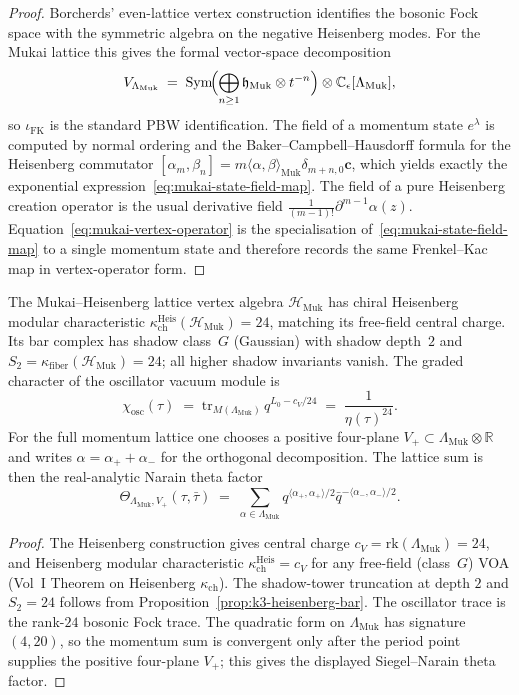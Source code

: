 \begin{proof}
Borcherds' even-lattice vertex construction identifies the bosonic Fock
space with the symmetric algebra on the negative Heisenberg modes. For
the Mukai lattice this gives the formal vector-space decomposition
\[
 V_{\Lambda_{\mathrm{Muk}}}
 \;=\;
 \mathrm{Sym}\!\Bigl(\bigoplus_{n\geq 1}\mathfrak{h}_{\mathrm{Muk}}\otimes t^{-n}\Bigr)
 \otimes
 \mathbb{C}_\epsilon[\Lambda_{\mathrm{Muk}}],
\]
so $\iota_{\mathrm{FK}}$ is the standard PBW identification. The field of a momentum
state $e^\lambda$ is computed by normal ordering and the Baker--Campbell--Hausdorff
formula for the Heisenberg commutator
$[\alpha_m,\beta_n]=m\langle\alpha,\beta\rangle_{\mathrm{Muk}}\delta_{m+n,0}\mathbf{c}$,
which yields exactly the exponential expression~\eqref{eq:mukai-state-field-map}. The
field of a pure Heisenberg creation operator is the usual derivative field
$\frac{1}{(m-1)!}\partial^{m-1}\alpha(z)$. Equation~\eqref{eq:mukai-vertex-operator} is
the specialisation of~\eqref{eq:mukai-state-field-map} to a single momentum state and
therefore records the same Frenkel--Kac map in vertex-operator form.
\end{proof}

\begin{proposition}
\label{prop:mukai-voa-kappa}
The Mukai--Heisenberg lattice vertex algebra $\mathcal{H}_{\mathrm{Muk}}$ has chiral
Heisenberg modular characteristic $\kappa_{\mathrm{ch}}^{\mathrm{Heis}}
(\mathcal{H}_{\mathrm{Muk}}) = 24$, matching its free-field central charge.
Its bar complex has shadow class~$G$ (Gaussian) with shadow depth~$2$ and
$S_2 = \kappa_{\mathrm{fiber}}(\mathcal{H}_{\mathrm{Muk}}) = 24$; all higher
shadow invariants vanish. The graded character of the oscillator vacuum
module is
\[
 \chi_{\mathrm{osc}}(\tau)
 \;=\;
 \mathrm{tr}_{M(\Lambda_{\mathrm{Muk}})}\,q^{L_0 - c_V/24}
 \;=\;
 \frac{1}{\eta(\tau)^{24}}.
\]
For the full momentum lattice one chooses a positive four-plane
$V_+\subset\Lambda_{\mathrm{Muk}}\otimes\mathbb R$ and writes
$\alpha=\alpha_+ + \alpha_-$ for the orthogonal decomposition. The lattice
sum is then the real-analytic Narain theta factor
\[
 \Theta_{\Lambda_{\mathrm{Muk}},V_+}(\tau,\bar\tau)
 \;=\;
 \sum_{\alpha\in\Lambda_{\mathrm{Muk}}}
 q^{\langle\alpha_+,\alpha_+\rangle/2}
 \bar q^{-\langle\alpha_-,\alpha_-\rangle/2}.
\]
\end{proposition}

\begin{proof}
The Heisenberg construction gives central charge
$c_V = \mathrm{rk}(\Lambda_{\mathrm{Muk}})=24$, and Heisenberg modular characteristic
$\kappa_{\mathrm{ch}}^{\mathrm{Heis}} = c_V$ for any free-field (class~$G$) VOA
(Vol~I Theorem on Heisenberg $\kappa_{\mathrm{ch}}$). The shadow-tower
truncation at depth $2$ and $S_2 = 24$ follows from
Proposition~\ref{prop:k3-heisenberg-bar}. The oscillator trace is the
rank-$24$ bosonic Fock trace. The quadratic form on
$\Lambda_{\mathrm{Muk}}$ has signature $(4,20)$, so the momentum sum is
convergent only after the period point supplies the positive four-plane
$V_+$; this gives the displayed Siegel--Narain theta factor.
\end{proof}

